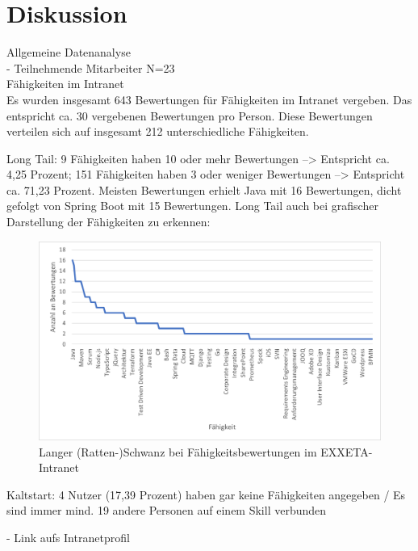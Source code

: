 \chapter{Diskussion}
\label{ch:diskussion}
Allgemeine Datenanalyse\\
- Teilnehmende Mitarbeiter N=23\\

Fähigkeiten im Intranet\\
Es wurden insgesamt 643 Bewertungen für Fähigkeiten im Intranet vergeben. Das entspricht ca. 30 vergebenen Bewertungen pro Person. Diese Bewertungen verteilen sich auf insgesamt 212 unterschiedliche Fähigkeiten.

Long Tail: 9 Fähigkeiten haben 10 oder mehr Bewertungen --> Entspricht ca. 4,25 Prozent; 151 Fähigkeiten haben 3 oder weniger Bewertungen --> Entspricht ca. 71,23 Prozent. Meisten Bewertungen erhielt Java mit 16 Bewertungen, dicht gefolgt von Spring Boot mit 15 Bewertungen. Long Tail auch bei grafischer Darstellung der Fähigkeiten zu erkennen:

\begin{figure}[h]
	\centering
	\includegraphics[width=1\textwidth]{gfx/long-tail-intranet.png}
	\caption{Langer (Ratten-)Schwanz bei Fähigkeitsbewertungen im EXXETA-Intranet}
	\label{fig:diskussion:abb1}
\end{figure}

Kaltstart: 4 Nutzer (17,39 Prozent) haben gar keine Fähigkeiten angegeben / Es sind immer mind. 19 andere Personen auf einem Skill verbunden

\newpage
- Link aufs Intranetprofil

